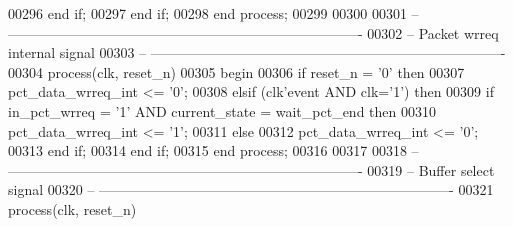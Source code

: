 \begin{DoxyCode}
00296       \textcolor{keywordflow}{end} \textcolor{keywordflow}{if};
00297    \textcolor{keywordflow}{end} \textcolor{keywordflow}{if};
00298 \textcolor{keywordflow}{end} \textcolor{keywordflow}{process};
00299 
00300 
00301 \textcolor{keyword}{-- ----------------------------------------------------------------------------}
00302 \textcolor{keyword}{-- Packet wrreq internal signal}
00303 \textcolor{keyword}{-- ----------------------------------------------------------------------------}
00304 \textcolor{keywordflow}{process}(clk, reset_n)
00305 \textcolor{vhdlkeyword}{begin}
00306    \textcolor{keywordflow}{if} \textcolor{vhdlchar}{reset_n} \textcolor{vhdlchar}{=} \textcolor{vhdlchar}{'}\textcolor{vhdllogic}{}\textcolor{vhdllogic}{0}\textcolor{vhdlchar}{'} \textcolor{keywordflow}{then}    
00307       \textcolor{vhdlchar}{pct_data_wrreq_int}  \textcolor{vhdlchar}{<=} \textcolor{vhdlchar}{'}\textcolor{vhdllogic}{}\textcolor{vhdllogic}{0}\textcolor{vhdlchar}{'};
00308    \textcolor{keywordflow}{elsif} \textcolor{vhdlchar}{(}\textcolor{vhdlchar}{clk}\textcolor{vhdlchar}{'}\textcolor{vhdlkeyword}{event} \textcolor{keywordflow}{AND} \textcolor{vhdlchar}{clk}\textcolor{vhdlchar}{=}\textcolor{vhdlchar}{'}\textcolor{vhdllogic}{}\textcolor{vhdllogic}{1}\textcolor{vhdlchar}{'}\textcolor{vhdlchar}{)} \textcolor{keywordflow}{then} 
00309       \textcolor{keywordflow}{if} \textcolor{vhdlchar}{in_pct_wrreq} \textcolor{vhdlchar}{=} \textcolor{vhdlchar}{'}\textcolor{vhdllogic}{}\textcolor{vhdllogic}{1}\textcolor{vhdlchar}{'} \textcolor{keywordflow}{AND} \textcolor{vhdlchar}{current_state} \textcolor{vhdlchar}{=} \textcolor{vhdlchar}{wait\_pct\_end} \textcolor{keywordflow}{then}  
00310          \textcolor{vhdlchar}{pct_data_wrreq_int}  \textcolor{vhdlchar}{<=} \textcolor{vhdlchar}{'}\textcolor{vhdllogic}{}\textcolor{vhdllogic}{1}\textcolor{vhdlchar}{'};
00311       \textcolor{keywordflow}{else}    
00312          \textcolor{vhdlchar}{pct_data_wrreq_int}  \textcolor{vhdlchar}{<=} \textcolor{vhdlchar}{'}\textcolor{vhdllogic}{}\textcolor{vhdllogic}{0}\textcolor{vhdlchar}{'};
00313       \textcolor{keywordflow}{end} \textcolor{keywordflow}{if};
00314    \textcolor{keywordflow}{end} \textcolor{keywordflow}{if};
00315 \textcolor{keywordflow}{end} \textcolor{keywordflow}{process};
00316 
00317 
00318 \textcolor{keyword}{-- ----------------------------------------------------------------------------}
00319 \textcolor{keyword}{-- Buffer select signal }
00320 \textcolor{keyword}{-- ----------------------------------------------------------------------------}
00321 \textcolor{keywordflow}{process}(clk, reset_n)

\end{DoxyCode}
